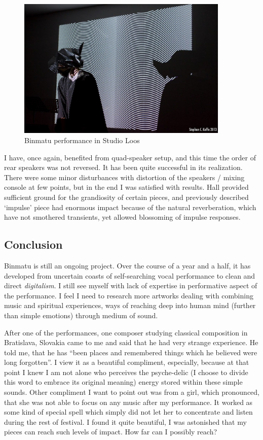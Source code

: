 \documentclass[12pt,a4paper,oneside]{report}
\begin{document}
\begin{figure}  
  \centering
    \includegraphics[width=0.9\textwidth]{img/binmatu_perfo}
	\caption{Binmatu performance in Studio Loos}
	\label{fig:binmatu_perfo}
\end{figure}

I have, once again, benefited from quad-speaker setup, and this time the order of rear speakers was not reversed. It has been quite successful in its realization. There were some minor disturbances with distortion of the speakers / mixing console at few points, but in the end I was satisfied with results. Hall provided sufficient ground for the grandiosity of certain pieces, and previously described `impulse' piece had enormous impact because of the natural reverberation, which have not smothered transients, yet allowed blossoming of impulse responses.

\subsection{Conclusion} Binmatu is still an ongoing project. Over the course of a year and a half, it has developed from uncertain coasts of self-searching vocal performance to clean and direct \emph{digitalism}. I still see myself with lack of expertise in performative aspect of the performance. I feel I need to research more artworks dealing with combining music and spiritual experiences, ways of reaching deep into human mind (further than simple emotions) through medium of sound. 

After one of the performances, one composer studying classical composition in Bratislava, Slovakia came to me and said that he had very strange experience. He told me, that he has ``been places and remembered things which he believed were long forgotten''. I view it as a beautiful compliment, especially, because at that point I knew I am not alone who perceives the psyche-delic (I choose to divide this word to embrace its original meaning) energy stored within these simple sounds. Other compliment I want to point out was from a girl, which pronounced, that she was not able to focus on any music after my performance. It worked as some kind of special spell which simply did not let her to concentrate and listen during the rest of festival. I found it quite beautiful, I was astonished that my pieces can reach such levels of impact. How far can I possibly reach?
\end{document}
